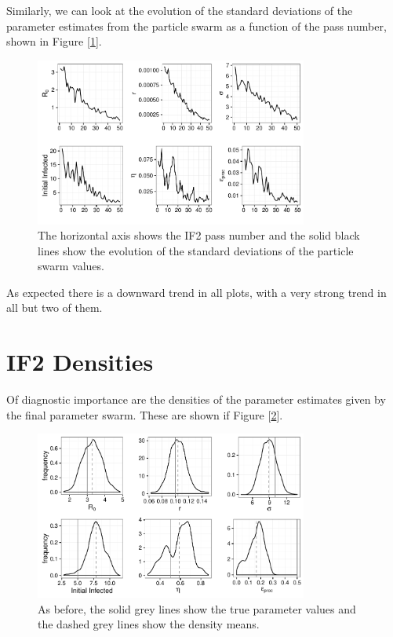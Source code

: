     Similarly, we can look at the evolution of the standard deviations of the parameter estimates from the particle swarm as a function of the pass number, shown in Figure [\ref{if2sdconvergence}].

    \begin{figure}
        \centering
        \captionsetup{width=.8\linewidth}
        \includegraphics[width=0.8\textwidth]{./images/if2sdconvergence.pdf}
        \caption{The horizontal axis shows the IF2 pass number and the solid black lines show the evolution of the standard deviations of the particle swarm values. \label{if2sdconvergence}}
    \end{figure}

    As expected there is a downward trend in all plots, with a very strong trend in all but two of them.


\section{IF2 Densities}

	Of diagnostic importance are the densities of the parameter estimates given by the final parameter swarm. These are shown if Figure [\ref{sc1if2kernels}].

	\begin{figure}
        \centering
        \captionsetup{width=.8\linewidth}
        \includegraphics[width=0.8\textwidth]{./images/if2kernels.pdf}
        \caption{As before, the solid grey lines show the true parameter values and the dashed grey lines show the density means. \label{sc1if2kernels}}
    \end{figure}

